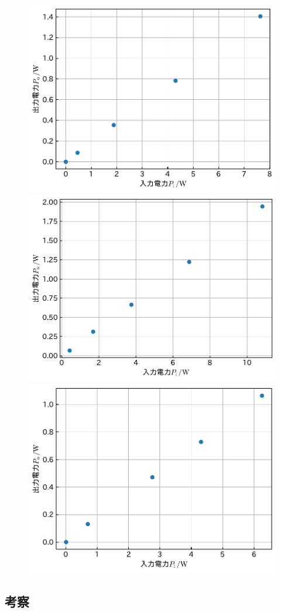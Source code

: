 \documentclass[1_power_supply.tex]{subfiles}
\begin{document}
\begin{figure}[htbp]
	\vspace{1mm}
	\begin{minipage}{0.45\columnwidth}
		\centering
		\includegraphics[width=0.8\columnwidth]{2_60p.pdf}
		\caption{}\label{fig:2_60p}
	\end{minipage}
	\begin{minipage}{0.45\columnwidth}
		\centering
		\includegraphics[width=0.8\columnwidth]{2_75p.pdf}
		\caption{}\label{fig:2_70p}
	\end{minipage}

	\vspace{1mm}
	\begin{minipage}{0.45\columnwidth}
		\centering
		\includegraphics[width=0.8\columnwidth]{2_80p.pdf}
		\caption{}\label{fig:2_80p}
	\end{minipage}
	\begin{minipage}{0.45\columnwidth}
	\end{minipage}
\end{figure}

\subsection{考察}
\end{document}
